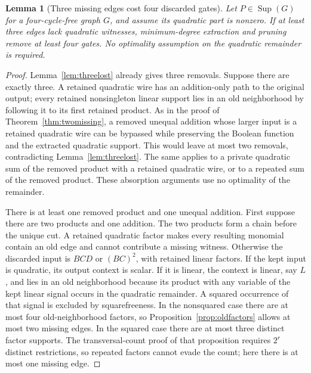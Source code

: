 \documentclass[11pt]{article}
\newcommand{\Sup}{\operatorname{Sup}}
\newtheorem{lemma}[theorem]{Lemma}
\theoremstyle{definition}
\theoremstyle{remark}
\begin{document}
\begin{lemma}[Three missing edges cost four discarded gates]\label{lem:fourlost}
Let $P\in\Sup(G)$ for a four-cycle-free graph $G$, and assume its quadratic part is nonzero. If at least three edges lack quadratic witnesses, minimum-degree extraction and pruning remove at least four gates. No optimality assumption on the quadratic remainder is required.
\end{lemma}
\begin{proof}
Lemma~\ref{lem:threelost} already gives three removals. Suppose there are exactly three. A retained quadratic wire has an addition-only path to the original output; every retained nonsingleton linear support lies in an old neighborhood by following it to its first retained product. As in the proof of Theorem~\ref{thm:twomissing}, a removed unequal addition whose larger input is a retained quadratic wire can be bypassed while preserving the Boolean function and the extracted quadratic support. This would leave at most two removals, contradicting Lemma~\ref{lem:threelost}. The same applies to a private quadratic sum of the removed product with a retained quadratic wire, or to a repeated sum of the removed product. These absorption arguments use no optimality of the remainder.

There is at least one removed product and one unequal addition. First suppose there are two products and one addition. The two products form a chain before the unique cut. A retained quadratic factor makes every resulting monomial contain an old edge and cannot contribute a missing witness. Otherwise the discarded input is $BCD$ or $(BC)^2$, with retained linear factors. If the kept input is quadratic, its output context is scalar. If it is linear, the context is linear, say $L$, and lies in an old neighborhood because its product with any variable of the kept linear signal occurs in the quadratic remainder. A squared occurrence of that signal is excluded by squarefreeness. In the nonsquared case there are at most four old-neighborhood factors, so Proposition~\ref{prop:oldfactors} allows at most two missing edges. In the squared case there are at most three distinct factor supports. The transversal-count proof of that proposition requires $2^r$ distinct restrictions, so repeated factors cannot evade the count; here there is at most one missing edge.


\end{proof}
\end{document}
